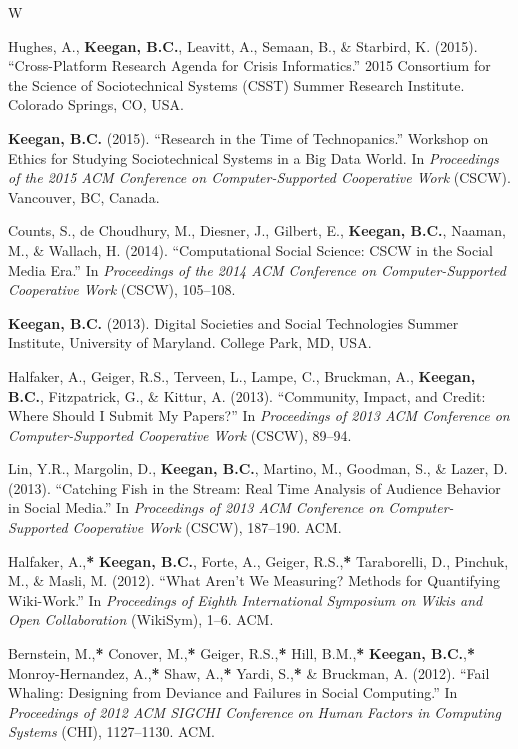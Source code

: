 \documentclass{cv}
\begin{document}
\begin{entries}{W}
		\item Hughes, A., \textbf{Keegan, B.C.}, Leavitt, A., Semaan, B., \& Starbird, K. (2015). ``Cross-Platform Research Agenda for Crisis Informatics.'' 2015 Consortium for the Science of Sociotechnical Systems (CSST) Summer Research Institute. Colorado Springs, CO, USA.
		\item \textbf{Keegan, B.C.} (2015). ``Research in the Time of Technopanics.'' Workshop on Ethics for Studying Sociotechnical Systems in a Big Data World. In \textit{Proceedings of the 2015 ACM Conference on Computer-Supported Cooperative Work} (CSCW). Vancouver, BC, Canada.
		\item Counts, S., de Choudhury, M., Diesner, J., Gilbert, E., \textbf{Keegan, B.C.}, Naaman, M., \& Wallach, H. (2014). ``Computational Social Science: CSCW in the Social Media Era.'' In \textit{Proceedings of the 2014 ACM Conference on Computer-Supported Cooperative Work} (CSCW), 105--108. 
		\item \textbf{Keegan, B.C.} (2013). Digital Societies and Social Technologies Summer Institute, University of Maryland. College Park, MD, USA.
		\item Halfaker, A., Geiger, R.S., Terveen, L., Lampe, C., Bruckman, A., \textbf{Keegan, B.C.}, Fitzpatrick, G., \& Kittur, A. (2013). ``Community, Impact, and Credit: Where Should I Submit My Papers?'' In \textit{Proceedings of 2013 ACM Conference on Computer-Supported Cooperative Work} (CSCW), 89--94. 
		\item Lin, Y.R., Margolin, D., \textbf{Keegan, B.C.}, Martino, M., Goodman, S., \& Lazer, D. (2013). ``Catching Fish in the Stream: Real Time Analysis of Audience Behavior in Social Media.'' In \textit{Proceedings of 2013 ACM Conference on Computer-Supported Cooperative Work} (CSCW), 187--190. ACM. 
		\item Halfaker, A.,\textbf{*} \textbf{Keegan, B.C.}, Forte, A., Geiger, R.S.,\textbf{*} Taraborelli, D., Pinchuk, M., \& Masli, M. (2012). ``What Aren't We Measuring? Methods for Quantifying Wiki-Work.'' In \textit{Proceedings of Eighth International Symposium on Wikis and Open Collaboration} (WikiSym), 1--6. ACM. 
		\item Bernstein, M.,\textbf{*} Conover, M.,\textbf{*} Geiger, R.S.,\textbf{*} Hill, B.M.,\textbf{*} \textbf{Keegan, B.C.},\textbf{*} Monroy-Hernandez, A.,\textbf{*} Shaw, A.,\textbf{*} Yardi, S.,\textbf{*} \& Bruckman, A. (2012). ``Fail Whaling: Designing from Deviance and Failures in Social Computing.'' In \textit{Proceedings of 2012 ACM SIGCHI Conference on Human Factors in Computing Systems} (CHI), 1127--1130. ACM. 

\end{entries}
\end{document}
